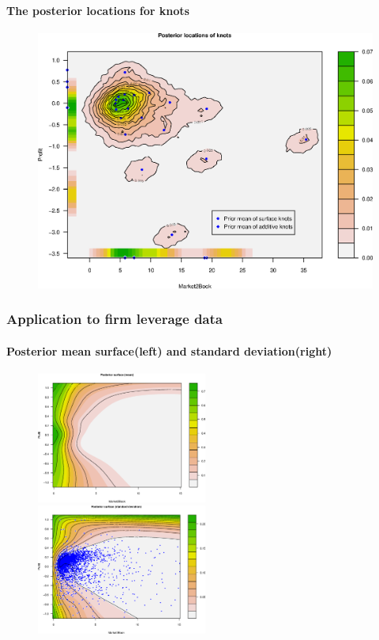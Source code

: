 \documentclass[10pt]{beamer}
\begin{document}
\begin{frame}[plain]
  \framesubtitle{The posterior locations for knots}
  \begin{center}
    \begin{figure}
      \includegraphics[height=\textheight]{RajanPostKnots.eps}
    \end{figure}
  \end{center}
\end{frame}

\begin{frame}
  \frametitle{Application to firm leverage data}
  \framesubtitle{Posterior mean surface(left) and standard deviation(right)}
  \begin{center}
    \begin{figure}
      \includegraphics[width=0.5\textwidth]{RajanPostMean.eps}~~~\includegraphics[width=0.5\textwidth]{RajanPostSD.eps}
    \end{figure}
  \end{center}
\end{frame}
\end{document}
